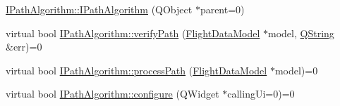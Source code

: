 \begin{DoxyCompactItemize}
\hyperlink{group___path_gafe016f55fde1369cf1d9301f86b37c2a}{I\-Path\-Algorithm\-::\-I\-Path\-Algorithm} (Q\-Object $\ast$parent=0)
\item 
virtual bool \hyperlink{group___path_ga115e5e8fbbb0f1e2a1208be63bafdb5e}{I\-Path\-Algorithm\-::verify\-Path} (\hyperlink{class_flight_data_model}{Flight\-Data\-Model} $\ast$model, \hyperlink{group___u_a_v_objects_plugin_gab9d252f49c333c94a72f97ce3105a32d}{Q\-String} \&err)=0
\item 
virtual bool \hyperlink{group___path_ga7c93a036e8d5904a4c76444e38ec96b9}{I\-Path\-Algorithm\-::process\-Path} (\hyperlink{class_flight_data_model}{Flight\-Data\-Model} $\ast$model)=0
\item 
virtual bool \hyperlink{group___path_ga4157a802d06807c33e402f6a51f9f366}{I\-Path\-Algorithm\-::configure} (Q\-Widget $\ast$calling\-Ui=0)=0
\end{DoxyCompactItemize}
